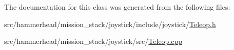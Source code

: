 The documentation for this class was generated from the following files\+:\begin{DoxyCompactItemize}
\item 
src/hammerhead/mission\+\_\+stack/joystick/include/joystick/\hyperlink{Teleop_8h}{Teleop.\+h}\item 
src/hammerhead/mission\+\_\+stack/joystick/src/\hyperlink{Teleop_8cpp}{Teleop.\+cpp}\end{DoxyCompactItemize}
